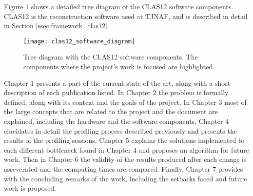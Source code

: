 



Figure \ref{fig:clas12_software_diagram} shows a detailed tree diagram of the CLAS12 software components.
CLAS12 is the reconstruction software used at TJNAF, and is described in detail in Section \ref{ssec:framework_clas12}.

    \begin{figure}[ht]
        \centering
        \texttt{[image: clas12\_software\_diagram]}
        \caption{\label{fig:clas12_software_diagram} Tree diagram with the CLAS12 software components. The components where the project's work is focused are highlighted.}
    \end{figure}

\newpage

Chapter $1$ presents a part of the current state of the art, along with a short description of each publication listed.
In Chapter $2$ the problem is formally defined, along with its context and the goals of the project.
In Chapter $3$ most of the large concepts that are related to the project and the document are explained, including the hardware and the software components.
Chapter $4$ elucidates in detail the profiling process described previously and presents the results of the profiling sessions.
Chapter $5$ explains the solutions implemented to each different bottleneck found in Chapter $4$ and proposes an algorithm for future work.
Then in Chapter $6$ the validity of the results produced after each change is asseverated and the computing times are compared.
Finally, Chapter $7$ provides with the concluding remarks of the work, including the setbacks faced and future work is proposed. %
